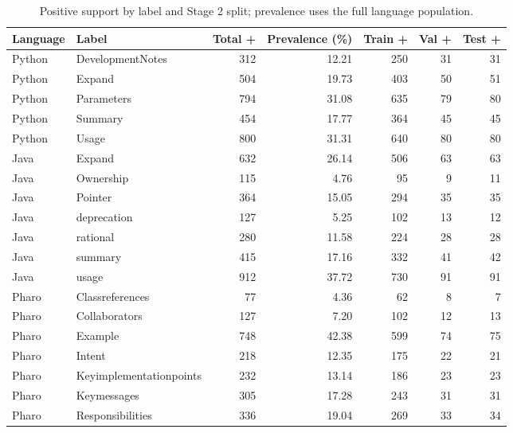 \begin{table}[htbp]
\centering\small
\caption{Positive support by label and Stage 2 split; prevalence uses the full language population.}\label{tab:labels}
\begin{tabular}{llrrrrr}\toprule
Language & Label & Total + & Prevalence (\%) & Train + & Val + & Test +\\\midrule
Python & DevelopmentNotes & 312 & 12.21 & 250 & 31 & 31\\
Python & Expand & 504 & 19.73 & 403 & 50 & 51\\
Python & Parameters & 794 & 31.08 & 635 & 79 & 80\\
Python & Summary & 454 & 17.77 & 364 & 45 & 45\\
Python & Usage & 800 & 31.31 & 640 & 80 & 80\\
Java & Expand & 632 & 26.14 & 506 & 63 & 63\\
Java & Ownership & 115 & 4.76 & 95 & 9 & 11\\
Java & Pointer & 364 & 15.05 & 294 & 35 & 35\\
Java & deprecation & 127 & 5.25 & 102 & 13 & 12\\
Java & rational & 280 & 11.58 & 224 & 28 & 28\\
Java & summary & 415 & 17.16 & 332 & 41 & 42\\
Java & usage & 912 & 37.72 & 730 & 91 & 91\\
Pharo & Classreferences & 77 & 4.36 & 62 & 8 & 7\\
Pharo & Collaborators & 127 & 7.20 & 102 & 12 & 13\\
Pharo & Example & 748 & 42.38 & 599 & 74 & 75\\
Pharo & Intent & 218 & 12.35 & 175 & 22 & 21\\
Pharo & Keyimplementationpoints & 232 & 13.14 & 186 & 23 & 23\\
Pharo & Keymessages & 305 & 17.28 & 243 & 31 & 31\\
Pharo & Responsibilities & 336 & 19.04 & 269 & 33 & 34\\
\bottomrule\end{tabular}
\end{table}
